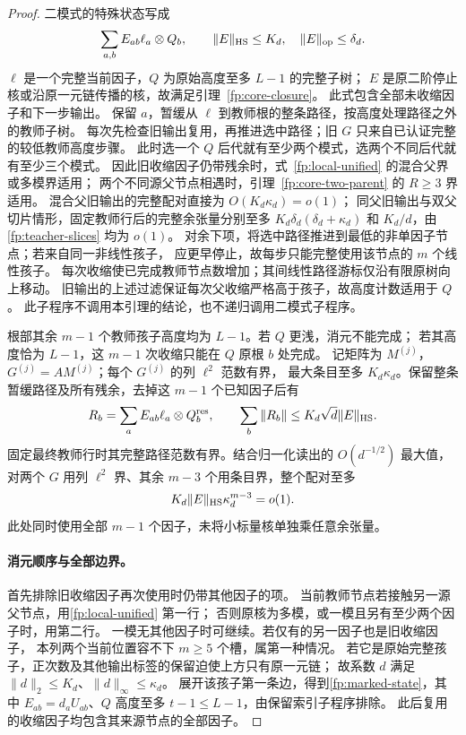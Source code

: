 \documentclass[a4paper]{tufte-handout}
\begin{document}
\begin{fullwidth}
\begin{proof}
二模式的特殊状态写成
\begin{equation}\label{fp:marked-state}
 \sum_{a,b}E_{ab}\ell_a\otimes Q_b,
 \qquad \|E\|_{\rm HS}\le K_d,\quad\|E\|_{\rm op}\le\delta_d.
\end{equation}
$\ell$ 是一个完整当前因子，$Q$ 为原始高度至多 $L-1$ 的完整子树；
$E$ 是原二阶停止核或沿原一元链传播的核，故满足引理~\ref{fp:core-closure}。
此式包含全部未收缩因子和下一步输出。
保留 $a$，暂缓从 $\ell$ 到教师根的整条路径，按高度处理路径之外的教师子树。
每次先检查旧输出复用，再推进选中路径；旧 $G$ 只来自已认证完整的较低教师高度步骤。
此时选一个 $Q$ 后代就有至少两个模式，选两个不同后代就有至少三个模式。
因此旧收缩因子仍带残余时，式~\eqref{fp:local-unified} 的混合父界或多模界适用；
两个不同源父节点相遇时，引理~\ref{fp:core-two-parent} 的 $R\ge3$ 界适用。
混合父旧输出的完整配对直接为 $O(K_d\kappa_d)=o(1)$；
同父旧输出与双父切片情形，固定教师行后的完整余张量分别至多
$K_d\delta_d(\delta_d+\kappa_d)$ 和 $K_d/d$，由\eqref{fp:teacher-slices} 均为 $o(1)$。
对余下项，将选中路径推进到最低的非单因子节点；若来自同一非线性孩子，
应更早停止，故每步只能完整使用该节点的 $m$ 个线性孩子。
每次收缩使已完成教师节点数增加；其间线性路径游标仅沿有限原树向上移动。
旧输出的上述过滤保证每次父收缩严格高于孩子，故高度计数适用于 $Q$。
此子程序不调用本引理的结论，也不递归调用二模式子程序。

根部其余 $m-1$ 个教师孩子高度均为 $L-1$。若 $Q$ 更浅，消元不能完成；
若其高度恰为 $L-1$，这 $m-1$ 次收缩只能在 $Q$ 原根 $b$ 处完成。
记矩阵为 $M^{(j)}$，$G^{(j)}=AM^{(j)}$；每个 $G^{(j)}$ 的列 $\ell^2$ 范数有界，
最大条目至多 $K_d\kappa_d$。保留整条暂缓路径及所有残余，去掉这 $m-1$ 个已知因子后有
\[
 R_b=\sum_aE_{ab}\ell_a\otimes Q_b^{\rm res},\qquad
 \sum_b\|R_b\|\le K_d\sqrt d\|E\|_{\rm HS}.
\]
固定最终教师行时其完整路径范数有界。结合归一化读出的 $O(d^{-1/2})$ 最大值，
对两个 $G$ 用列 $\ell^2$ 界、其余 $m-3$ 个用条目界，整个配对至多
\begin{equation}\label{fp:marked-terminal}
 K_d\|E\|_{\rm HS}\kappa_d^{m-3}=o(1).
\end{equation}
此处同时使用全部 $m-1$ 个因子，未将小标量核单独乘任意余张量。

\paragraph{消元顺序与全部边界。}
首先排除旧收缩因子再次使用时仍带其他因子的项。
当前教师节点若接触另一源父节点，用\eqref{fp:local-unified} 第一行；
否则原核为多模，或一模且另有至少两个因子时，用第二行。
一模无其他因子时可继续。若仅有的另一因子也是旧收缩因子，
本列两个当前位置容不下 $m\ge5$ 个槽，属第一种情况。
若它是原始完整孩子，正次数及其他输出标签的保留迫使上方只有原一元链；
故系数 $d$ 满足 $\|d\|_2\le K_d$、$\|d\|_\infty\le\kappa_d$。
展开该孩子第一条边，得到\eqref{fp:marked-state}，其中
$E_{ab}=d_aU_{ab}$、$Q$ 高度至多 $t-1\le L-1$，由保留索引子程序排除。
此后复用的收缩因子均包含其来源节点的全部因子。


\end{proof}
\end{fullwidth}
\end{document}
